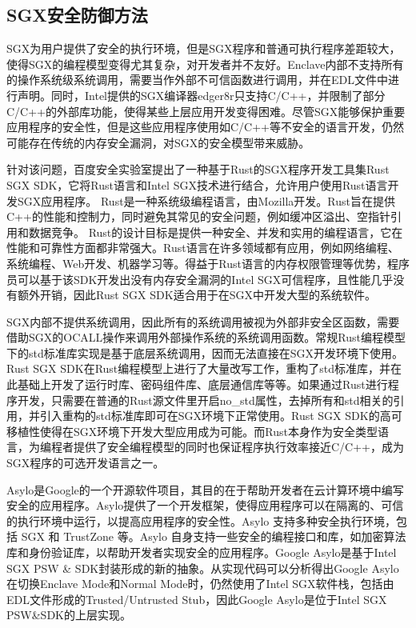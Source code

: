 \documentclass{source/Paper}
\begin{document}
        \subsection{SGX安全防御方法}
        SGX为用户提供了安全的执行环境，但是SGX程序和普通可执行程序差距较大，使得SGX的编程模型变得尤其复杂，对开发者并不友好。Enclave内部不支持所有的操作系统级系统调用，需要当作外部不可信函数进行调用，并在EDL文件中进行声明。同时，Intel提供的SGX编译器edger8r只支持C/C++，并限制了部分C/C++的外部库功能，使得某些上层应用开发变得困难。尽管SGX能够保护重要应用程序的安全性，但是这些应用程序使用如C/C++等不安全的语言开发，仍然可能存在传统的内存安全漏洞，对SGX的安全模型带来威胁。
        
        针对该问题，百度安全实验室提出了一种基于Rust的SGX程序开发工具集Rust SGX SDK\cite{wang2019towards}，它将Rust语言和Intel SGX技术进行结合，允许用户使用Rust语言开发SGX应用程序。
        Rust是一种系统级编程语言，由Mozilla开发。Rust旨在提供C++的性能和控制力，同时避免其常见的安全问题，例如缓冲区溢出、空指针引用和数据竞争。 Rust的设计目标是提供一种安全、并发和实用的编程语言，它在性能和可靠性方面都非常强大。Rust语言在许多领域都有应用，例如网络编程、系统编程、Web开发、机器学习等。得益于Rust语言的内存权限管理等优势，程序员可以基于该SDK开发出没有内存安全漏洞的Intel SGX可信程序，且性能几乎没有额外开销，因此Rust SGX SDK适合用于在SGX中开发大型的系统软件。

        SGX内部不提供系统调用，因此所有的系统调用被视为外部非安全区函数，需要借助SGX的OCALL操作来调用外部操作系统的系统调用函数。常规Rust编程模型下的std标准库实现是基于底层系统调用，因而无法直接在SGX开发环境下使用。Rust SGX SDK在Rust编程模型上进行了大量改写工作，重构了std标准库，并在此基础上开发了运行时库、密码组件库、底层通信库等等。如果通过Rust进行程序开发，只需要在普通的Rust源文件里开启no\_std属性，去掉所有和std相关的引用，并引入重构的std标准库即可在SGX环境下正常使用。Rust SGX SDK的高可移植性使得在SGX环境下开发大型应用成为可能。而Rust本身作为安全类型语言，为编程者提供了安全编程模型的同时也保证程序执行效率接近C/C++，成为SGX程序的可选开发语言之一。

        Asylo\cite{asylo}是Google的一个开源软件项目，其目的在于帮助开发者在云计算环境中编写安全的应用程序。Asylo提供了一个开发框架，使得应用程序可以在隔离的、可信的执行环境中运行，以提高应用程序的安全性。Asylo 支持多种安全执行环境，包括 SGX 和 TrustZone 等。Asylo 自身支持一些安全的编程接口和库，如加密算法库和身份验证库，以帮助开发者实现安全的应用程序。Google Asylo是基于Intel SGX PSW \& SDK封装形成的新的抽象。从实现代码可以分析得出Google Asylo在切换Enclave Mode和Normal Mode时，仍然使用了Intel SGX软件栈，包括由EDL文件形成的Trusted/Untrusted Stub，因此Google Asylo是位于Intel SGX PSW\&SDK的上层实现。
\end{document}
